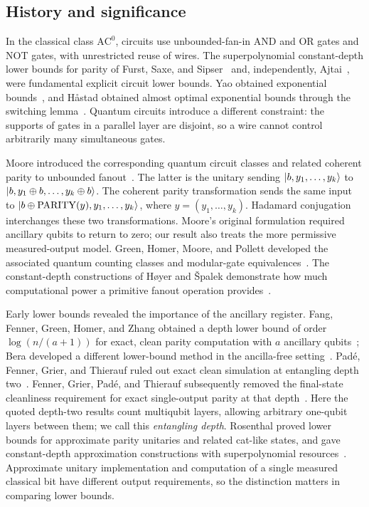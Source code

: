 \subsection{History and significance}
In the classical class $\mathrm{AC}^0$, circuits use unbounded-fan-in
AND and OR gates and NOT gates, with unrestricted reuse of wires.
The superpolynomial constant-depth lower bounds for parity of Furst,
Saxe, and Sipser~\cite{FurstSaxeSipser1984} and, independently,
Ajtai~\cite{Ajtai1983}, were fundamental explicit circuit lower bounds.
Yao obtained exponential bounds~\cite{Yao1985}, and H\aa stad obtained
almost optimal exponential bounds through the switching
lemma~\cite{Hastad1986}. Quantum circuits introduce a different
constraint: the supports of gates in a parallel layer are disjoint,
so a wire cannot control arbitrarily many simultaneous gates.

Moore introduced the corresponding quantum circuit classes and related
coherent parity to unbounded fanout~\cite{Moore1999}. The latter is the
unitary sending $\lvert b,y_1,\ldots,y_k\rangle$ to
$\lvert b,y_1\oplus b,\ldots,y_k\oplus b\rangle$. The coherent parity
transformation sends the same input to
$\lvert b\oplus\operatorname{PARITY}(y),y_1,\ldots,y_k\rangle$, where
$y=(y_1,\ldots,y_k)$. Hadamard conjugation interchanges these two
transformations. Moore's original
formulation required ancillary qubits to return to zero; our result
also treats the more permissive measured-output model.
Green, Homer, Moore, and Pollett developed the associated quantum
counting classes and modular-gate equivalences~\cite{GreenHomerMoorePollett2002}.
The constant-depth constructions of H\o yer and \v Spalek demonstrate
how much computational power a primitive fanout operation
provides~\cite{HoyerSpalek2005}.

Early lower bounds revealed the importance of the ancillary register.
Fang, Fenner, Green, Homer, and Zhang obtained a depth lower bound of
order $\log(n/(a+1))$ for exact, clean parity computation with $a$
ancillary qubits~\cite[Corollary 4.6]{FangFennerGreenHomerZhang2006};
Bera developed a different lower-bound method in the ancilla-free
setting~\cite{Bera2011}. Pad\'e, Fenner, Grier, and Thierauf ruled out
exact clean simulation at entangling depth two~\cite{PadeFennerGrierThierauf2020}.
Fenner, Grier, Pad\'e, and Thierauf subsequently removed the final-state
cleanliness requirement for exact single-output parity at that
depth~\cite[Theorem 6.1]{FennerGrierPadeThierauf2025}.
Here the quoted depth-two results count multiqubit layers, allowing
arbitrary one-qubit layers between them; we call this
\emph{entangling depth}. Rosenthal proved lower bounds for approximate
parity unitaries and related cat-like states, and gave constant-depth
approximation constructions with superpolynomial
resources~\cite{Rosenthal2021}. Approximate unitary implementation and
computation of a single measured classical bit have different output
requirements, so the distinction matters in comparing lower bounds.

